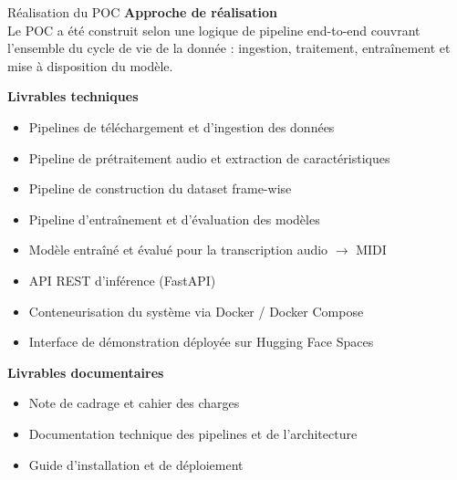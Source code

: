 \begin{frame}{Réalisation du POC}
	\textbf{Approche de réalisation}\\
	Le POC a été construit selon une logique de pipeline end-to-end couvrant l’ensemble du cycle de vie de la donnée : ingestion, traitement, entraînement et mise à disposition du modèle.
	
	\vspace{0.3cm}
	
	\textbf{Livrables techniques}\\
	\begin{itemize}
		\item Pipelines de téléchargement et d’ingestion des données
		\item Pipeline de prétraitement audio et extraction de caractéristiques
		\item Pipeline de construction du dataset frame-wise
		\item Pipeline d’entraînement et d’évaluation des modèles
		\item Modèle entraîné et évalué pour la transcription audio $\rightarrow$ MIDI
		\item API REST d’inférence (FastAPI)
		\item Conteneurisation du système via Docker / Docker Compose
		\item Interface de démonstration déployée sur Hugging Face Spaces
	\end{itemize}
	
	\vspace{0.3cm}
	
	\textbf{Livrables documentaires}\\
	\begin{itemize}
		\item Note de cadrage et cahier des charges
		\item Documentation technique des pipelines et de l’architecture
		\item Guide d’installation et de déploiement
	\end{itemize}
\end{frame}

